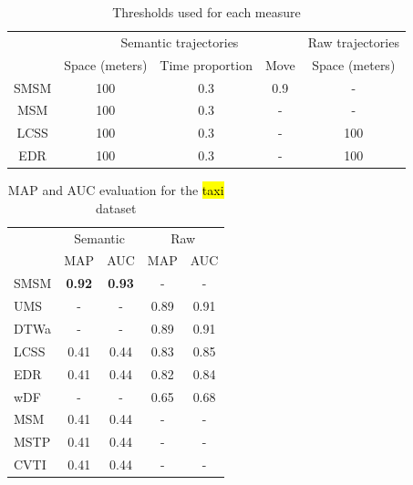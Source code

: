 \documentclass[12pt]{article}
\begin{document}
\begin{table}[!h]
\scriptsize
  \centering
  \begin{tabular}{|c|c|c|c|c|}
  	\hline
  & \multicolumn{3}{c|}{Semantic trajectories} & \multicolumn{1}{c|}{Raw trajectories} \\
 	\cline{2-5}
  & Space (meters) & Time proportion & Move & Space (meters) \\
  	\hline
 SMSM & 100 & 0.3 & 0.9 & - \\
 MSM & 100 & 0.3 & - & - \\
 LCSS & 100 & 0.3 & - & 100 \\
 EDR & 100 & 0.3 & - & 100 \\
    \hline
  \end{tabular}
  \caption{Thresholds used for each measure}
  \label{tab:san_francisco_thresholds}
\end{table}


\begin{table}[h]
\scriptsize
  \centering
  \begin{tabular}{|l|c|c|c|c|}
  	\hline
 & \multicolumn{2}{c}{Semantic} & \multicolumn{2}{|c|}{Raw} \\
 	\cline{2-5}
 & MAP & AUC & MAP & AUC \\
  	\hline
SMSM & \textbf{0.92} & \textbf{0.93} & - & -\\
UMS & - & - & 0.89 & 0.91 \\
DTWa & - & - & 0.89 & 0.91 \\
LCSS & 0.41 & 0.44 & 0.83 & 0.85 \\
EDR & 0.41 & 0.44 & 0.82 & 0.84 \\
wDF & - & - & 0.65 & 0.68 \\
MSM & 0.41 & 0.44 & - & - \\
MSTP & 0.41 & 0.44 & - & - \\
CVTI & 0.41 & 0.44 & - & - \\
    \hline
  \end{tabular}
  \caption{MAP and AUC evaluation for the \hl{taxi} dataset}
  \label{tab:sanfrancisco_measures_map_auc}
\end{table}
\end{document}
